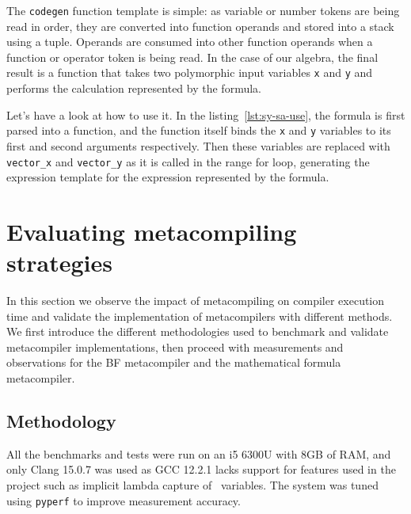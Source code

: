\documentclass[../../main.tex]{subfiles}
\begin{document}
The \lstinline|codegen| function template is simple: as variable or number tokens
are being read in order, they are converted into function operands and stored
into a stack using a tuple. Operands are consumed into other function operands
when a function or operator token is being read. In the case of our algebra,
the final result is a function that takes two polymorphic input variables
\lstinline|x| and \lstinline|y| and performs the calculation represented by the
formula.

\clearpage%



\clearpage%

Let's have a look at how to use it.
In the listing~\ref{lst:sy-sa-use}, the formula is first parsed into a function,
and the function itself binds the \lstinline|x| and \lstinline|y| variables to
its first and second arguments respectively. Then these variables are replaced
with \lstinline|vector_x| and \lstinline|vector_y| as it is called in the range
for loop, generating the expression template for the expression represented by
the formula.



\section{Evaluating metacompiling strategies}

In this section we observe the impact of metacompiling on compiler execution
time and validate the implementation of metacompilers with different methods.
We first introduce the different methodologies used to benchmark and validate
metacompiler implementations, then proceed with measurements and observations
for the BF metacompiler and the mathematical formula metacompiler.

\subsection{Methodology}

All the benchmarks and tests were run on an i5 6300U with 8GB of RAM, and only
Clang 15.0.7 was used as GCC 12.2.1 lacks support for features used in the
project such as implicit lambda capture of \constexpr~variables. The system was
tuned using \lstinline|pyperf| to improve measurement accuracy.\\
\end{document}
